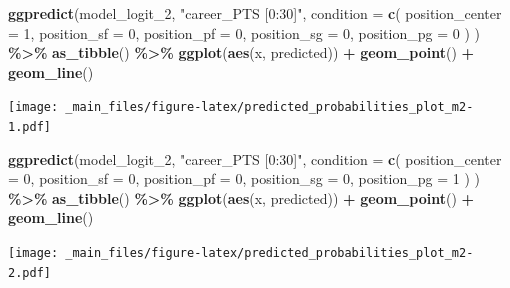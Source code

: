 \documentclass[
]{book}
\newenvironment{Shaded}{\begin{snugshade}}{\end{snugshade}}
\newcommand{\AttributeTok}[1]{\textcolor[rgb]{0.13,0.29,0.53}{#1}}
\newcommand{\DecValTok}[1]{\textcolor[rgb]{0.00,0.00,0.81}{#1}}
\newcommand{\FunctionTok}[1]{\textcolor[rgb]{0.13,0.29,0.53}{\textbf{#1}}}
\newcommand{\NormalTok}[1]{#1}
\newcommand{\SpecialCharTok}[1]{\textcolor[rgb]{0.81,0.36,0.00}{\textbf{#1}}}
\newcommand{\StringTok}[1]{\textcolor[rgb]{0.31,0.60,0.02}{#1}}
\begin{document}
\begin{Shaded}
\begin{Highlighting}[]
\FunctionTok{ggpredict}\NormalTok{(model\_logit\_2, }\StringTok{"career\_PTS [0:30]"}\NormalTok{,}
          \AttributeTok{condition =} \FunctionTok{c}\NormalTok{(}
            \AttributeTok{position\_center =} \DecValTok{1}\NormalTok{,}
            \AttributeTok{position\_sf =} \DecValTok{0}\NormalTok{,}
            \AttributeTok{position\_pf =} \DecValTok{0}\NormalTok{,}
            \AttributeTok{position\_sg =} \DecValTok{0}\NormalTok{,}
            \AttributeTok{position\_pg =} \DecValTok{0}
\NormalTok{            )}
\NormalTok{          ) }\SpecialCharTok{\%\textgreater{}\%}
  \FunctionTok{as\_tibble}\NormalTok{() }\SpecialCharTok{\%\textgreater{}\%} 
  \FunctionTok{ggplot}\NormalTok{(}\FunctionTok{aes}\NormalTok{(x, predicted)) }\SpecialCharTok{+}
  \FunctionTok{geom\_point}\NormalTok{() }\SpecialCharTok{+}
  \FunctionTok{geom\_line}\NormalTok{()}
\end{Highlighting}
\end{Shaded}

\texttt{[image: \_main\_files/figure-latex/predicted\_probabilities\_plot\_m2-1.pdf]}

\begin{Shaded}
\begin{Highlighting}[]
\FunctionTok{ggpredict}\NormalTok{(model\_logit\_2, }\StringTok{"career\_PTS [0:30]"}\NormalTok{,}
          \AttributeTok{condition =} \FunctionTok{c}\NormalTok{(}
            \AttributeTok{position\_center =} \DecValTok{0}\NormalTok{,}
            \AttributeTok{position\_sf =} \DecValTok{0}\NormalTok{,}
            \AttributeTok{position\_pf =} \DecValTok{0}\NormalTok{,}
            \AttributeTok{position\_sg =} \DecValTok{0}\NormalTok{,}
            \AttributeTok{position\_pg =} \DecValTok{1}
\NormalTok{            )}
\NormalTok{          ) }\SpecialCharTok{\%\textgreater{}\%}
  \FunctionTok{as\_tibble}\NormalTok{() }\SpecialCharTok{\%\textgreater{}\%} 
  \FunctionTok{ggplot}\NormalTok{(}\FunctionTok{aes}\NormalTok{(x, predicted)) }\SpecialCharTok{+}
  \FunctionTok{geom\_point}\NormalTok{() }\SpecialCharTok{+}
  \FunctionTok{geom\_line}\NormalTok{()}
\end{Highlighting}
\end{Shaded}

\texttt{[image: \_main\_files/figure-latex/predicted\_probabilities\_plot\_m2-2.pdf]}
\end{document}
